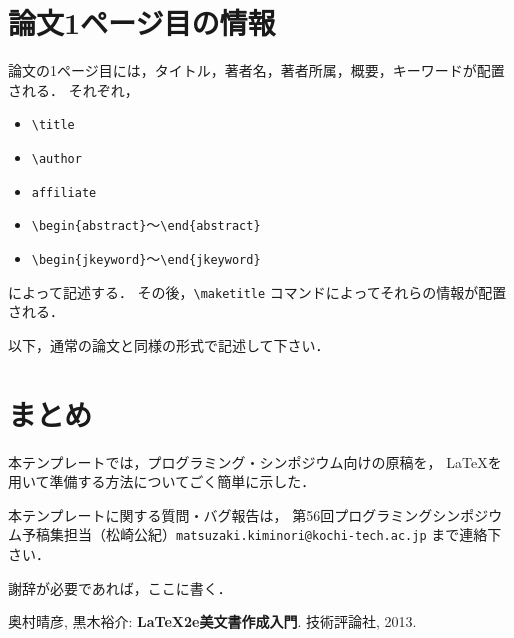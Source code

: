\documentclass{ipsjprosym}
\begin{document}
\section{論文1ページ目の情報}

論文の1ページ目には，タイトル，著者名，著者所属，概要，キーワードが配置される．
それぞれ，
\begin{itemize}
\item \verb|\title| 
\item \verb|\author|
\item \verb|affiliate|
\item \verb|\begin{abstract}|〜\verb|\end{abstract}|
\item \verb|\begin{jkeyword}|〜\verb|\end{jkeyword}|
\end{itemize}
によって記述する．
その後，\verb|\maketitle| コマンドによってそれらの情報が配置される．

以下，通常の論文と同様の形式で記述して下さい．

\section{まとめ}

本テンプレートでは，プログラミング・シンポジウム向けの原稿を，
\LaTeX を用いて準備する方法についてごく簡単に示した．

本テンプレートに関する質問・バグ報告は，
第56回プログラミングシンポジウム予稿集担当（松崎公紀）\verb|matsuzaki.kiminori@kochi-tech.ac.jp|
まで連絡下さい．

\begin{acknowledgment}
謝辞が必要であれば，ここに書く．
\end{acknowledgment}

% 
% 

\begin{thebibliography}{9}
  奥村晴彦, 黒木裕介: \textbf{LaTeX2e美文書作成入門}. 技術評論社, 2013.
\end{thebibliography}
\end{document}
